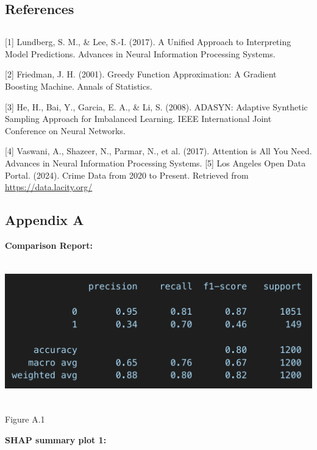 \documentclass[
]{article}
\begin{document}
\subsection{\texorpdfstring{References }{References }}\label{references}

\subsection{\texorpdfstring{ }{ }}\label{section}

{[}1{]} Lundberg, S. M., \& Lee, S.-I. (2017). A Unified Approach to
Interpreting Model Predictions. Advances in Neural Information
Processing Systems.

{[}2{]} Friedman, J. H. (2001). Greedy Function Approximation: A
Gradient Boosting Machine. Annals of Statistics.

{[}3{]} He, H., Bai, Y., Garcia, E. A., \& Li, S. (2008). ADASYN:
Adaptive Synthetic Sampling Approach for Imbalanced Learning. IEEE
International Joint Conference on Neural Networks.

{[}4{]} Vaswani, A., Shazeer, N., Parmar, N., et al. (2017). Attention
is All You Need. Advances in Neural Information Processing Systems.
{[}5{]} Los Angeles Open Data Portal. (2024). Crime Data from 2020 to
Present. Retrieved from \url{https://data.lacity.org/}

\subsection{Appendix A}\label{appendix-a}

\textbf{Comparison Report:}

\includegraphics[width=6.5in,height=2.42708in]{media/image1.png}

Figure A.1

\textbf{SHAP summary plot 1:}
\end{document}

